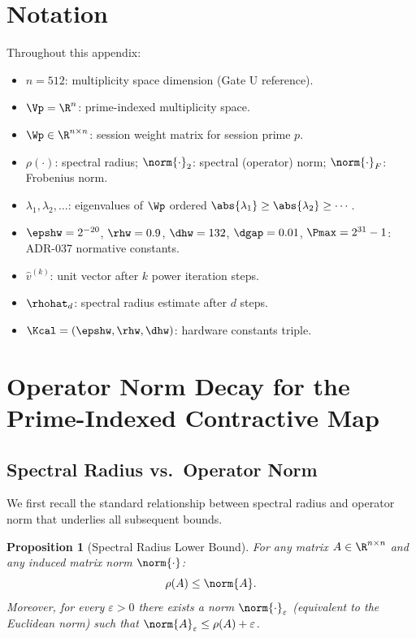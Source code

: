 \documentclass[12pt,letterpaper]{article}
\theoremstyle{plain}
\newtheorem{proposition}[theorem]{Proposition}
\theoremstyle{definition}
\theoremstyle{remark}
\begin{document}
\section*{Notation}

Throughout this appendix:
\begin{itemize}[noitemsep]
  \item \(n = 512\): multiplicity space dimension (Gate U reference).
  \item \(\Vp = \R^n\): prime-indexed multiplicity space.
  \item \(\Wp \in \R^{n \times n}\): session weight matrix for session prime \(p\).
  \item \(\rho(\cdot)\): spectral radius; \(\norm{\cdot}_2\): spectral (operator) norm;
        \(\norm{\cdot}_F\): Frobenius norm.
  \item \(\lambda_1, \lambda_2, \ldots\): eigenvalues of \(\Wp\) ordered
        \(\abs{\lambda_1} \geq \abs{\lambda_2} \geq \cdots\).
  \item \(\epshw = 2^{-20}\), \(\rhw = 0.9\), \(\dhw = 132\), \(\dgap = 0.01\),
        \(\Pmax = 2^{31}-1\): ADR-037 normative constants.
  \item \(\hat{v}^{(k)}\): unit vector after \(k\) power iteration steps.
  \item \(\rhohat_d\): spectral radius estimate after \(d\) steps.
  \item \(\Kcal = (\epshw, \rhw, \dhw)\): hardware constants triple.
\end{itemize}

\section{Operator Norm Decay for the Prime-Indexed Contractive Map}
\label{sec:decay}

\subsection{Spectral Radius vs.\ Operator Norm}

We first recall the standard relationship between spectral radius and operator
norm that underlies all subsequent bounds.

\begin{proposition}[Spectral Radius Lower Bound]
\label{prop:rho-lower}
For any matrix \(A \in \R^{n \times n}\) and any induced matrix norm
\(\norm{\cdot}\):
\[
  \rho(A) \leq \norm{A}.
\]
Moreover, for every \(\varepsilon > 0\) there exists a norm \(\norm{\cdot}_\varepsilon\)
(equivalent to the Euclidean norm) such that \(\norm{A}_\varepsilon \leq \rho(A) + \varepsilon\).
\end{proposition}
\end{document}
